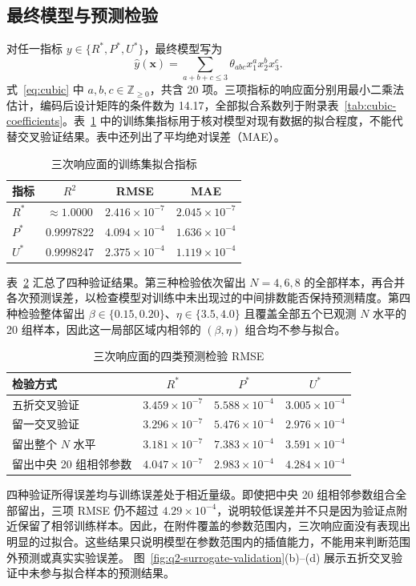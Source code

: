 \documentclass[withoutpreface,bwprint]{cumcmthesis}
\newcommand{\Rstar}{R^{*}}
\newcommand{\Pstar}{P^{*}}
\newcommand{\Ustar}{U^{*}}
\newcommand{\vect}[1]{\bm{#1}}
\begin{document}
\subsection{最终模型与预测检验}
对任一指标 $y\in\{\Rstar,\Pstar,\Ustar\}$，最终模型写为
\begin{equation}
\hat y(\vect x)=\sum_{a+b+c\leq3}\theta_{abc}x_1^a x_2^b x_3^c.
\label{eq:cubic}
\end{equation}
式~\eqref{eq:cubic} 中 $a,b,c\in\mathbb Z_{\geq0}$，共含 20 项。三项指标的响应面分别用最小二乘法估计，编码后设计矩阵的条件数为 14.17，全部拟合系数列于附录表~\ref{tab:cubic-coefficients}。表~\ref{tab:fit} 中的训练集指标用于核对模型对现有数据的拟合程度，不能代替交叉验证结果。表中还列出了平均绝对误差（MAE）。
\begin{table}[H]
\centering
\caption{三次响应面的训练集拟合指标}
\label{tab:fit}
\begin{tabular}{lccc}
\toprule
指标 & $R^2$ & RMSE & MAE\\
\midrule
$\Rstar$ & $\approx1.0000$ & $2.416\times10^{-7}$ & $2.045\times10^{-7}$\\
$\Pstar$ & 0.9997822 & $4.094\times10^{-4}$ & $1.636\times10^{-4}$\\
$\Ustar$ & 0.9998247 & $2.375\times10^{-4}$ & $1.119\times10^{-4}$\\
\bottomrule
\end{tabular}
\end{table}

表~\ref{tab:q2-validation-summary} 汇总了四种验证结果。第三种检验依次留出 $N=4,6,8$ 的全部样本，再合并各次预测误差，以检查模型对训练中未出现过的中间排数能否保持预测精度。第四种检验整体留出 $\beta\in\{0.15,0.20\}$、$\eta\in\{3.5,4.0\}$ 且覆盖全部五个已观测 $N$ 水平的 20 组样本，因此这一局部区域内相邻的 $(\beta,\eta)$ 组合均不参与拟合。
\begin{table}[H]
\centering
\caption{三次响应面的四类预测检验 RMSE}
\label{tab:q2-validation-summary}
\begin{tabular}{lccc}
\toprule
检验方式 & $\Rstar$ & $\Pstar$ & $\Ustar$\\
\midrule
五折交叉验证 & $3.459\times10^{-7}$ & $5.588\times10^{-4}$ & $3.005\times10^{-4}$\\
留一交叉验证 & $3.296\times10^{-7}$ & $5.476\times10^{-4}$ & $2.976\times10^{-4}$\\
留出整个 $N$ 水平 & $3.181\times10^{-7}$ & $7.383\times10^{-4}$ & $3.591\times10^{-4}$\\
留出中央 20 组相邻参数 & $4.047\times10^{-7}$ & $2.983\times10^{-4}$ & $4.284\times10^{-4}$\\
\bottomrule
\end{tabular}
\end{table}
四种验证所得误差均与训练误差处于相近量级。即使把中央 20 组相邻参数组合全部留出，三项 RMSE 仍不超过 $4.29\times10^{-4}$，说明较低误差并不只是因为验证点附近保留了相邻训练样本。因此，在附件覆盖的参数范围内，三次响应面没有表现出明显的过拟合。这些结果只说明模型在参数范围内的插值能力，不能用来判断范围外预测或真实实验误差。
图~\ref{fig:q2-surrogate-validation}(b)--(d) 展示五折交叉验证中未参与拟合样本的预测结果。
\end{document}
